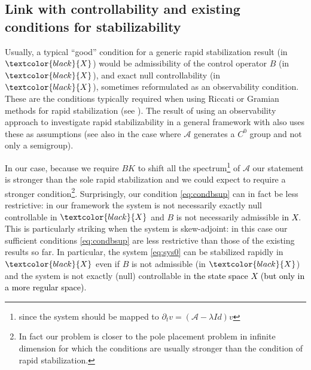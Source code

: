\documentclass[11pt, dvipsnames]{amsart}
\begin{document}
\subsection{Link with controllability and existing conditions for stabilizability}
\label{sec:discussion}

Usually, a typical ``good'' condition for a generic rapid stabilization result (in $\textcolor{black}{X}$) would be admissibility of the control operator $B$ (in $\textcolor{black}{X}$), and exact null controllability (in $\textcolor{black}{X}$), sometimes reformulated as an observability condition.
These are the conditions 
typically required when using Riccati or Gramian methods for rapid stabilization (see \cite{slemrod1972linear,komornik1997rapid,urquiza2005rapid,LT1,LT2}).
The result of \cite[Proposition 1]{trelat2019characterization} using an observability approach to investigate rapid stabilizability in a general framework with also 
uses these as assumptions (see also \cite{slemrod1974note,nguyen2024stabilization} in the case where  $\mathcal{A}$ generates a $C^{0}$ group and not only a semigroup). 

In our case, because we require $BK$ to shift all the spectrum\footnote{since the system should be mapped to $\partial_{t}v = (\mathcal{A}-\lambda Id) v$} of $\mathcal{A}$ our statement is stronger than the sole rapid stabilization and we could expect to require a stronger condition\footnote{In fact our problem is closer to the pole placement problem in infinite dimension for which the conditions are usually stronger than the condition of rapid stabilization.}.
Surprisingly, our condition \eqref{eq:condbsup} can in fact be less restrictive: 
in our framework the system is not necessarily exactly null controllable in $\textcolor{black}{X}$ and $B$ is not necessarily admissible \textcolor{black}{in $X$}.
This is particularly striking when the system is skew-adjoint: in this case our sufficient conditions \eqref{eq:condbsup} are
less restrictive than those of 
the existing results so far. In particular, the system \eqref{eq:sys0} can be stabilized rapidly in $\textcolor{black}{X}$ even if $B$ is not admissible (in $\textcolor{black}{X}$) and the system is not exactly (null) controllable in \textcolor{black}{the state space $X$ (but only in a more regular space)}.\\ 
\end{document}
